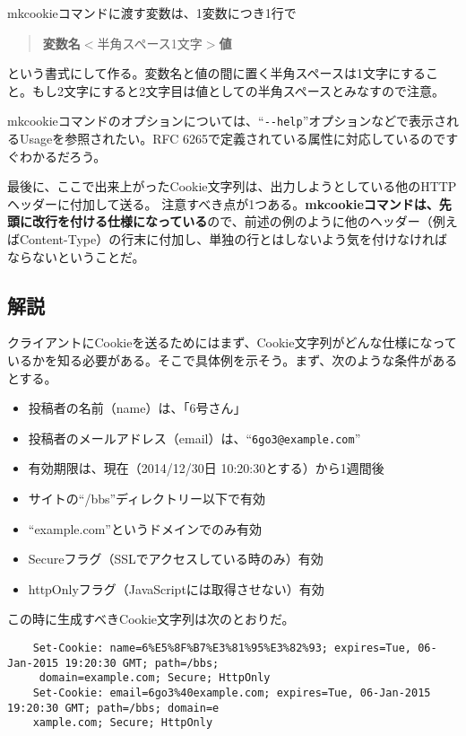 mkcookieコマンドに渡す変数は、1変数につき1行で
\begin{quote}
	\textbf{変数名}$<$半角スペース1文字$>$\textbf{値}
\end{quote}
という書式にして作る。変数名と値の間に置く半角スペースは1文字にすること。もし2文字にすると2文字目は値としての半角スペースとみなすので注意。

mkcookieコマンドのオプションについては、``\verb|--help|''オプションなどで表示されるUsageを参照されたい。RFC 6265で定義されている属性に対応しているのですぐわかるだろう。

最後に、ここで出来上がったCookie文字列は、出力しようとしている他のHTTPヘッダーに付加して送る。
注意すべき点が1つある。\textbf{mkcookieコマンドは、先頭に改行を付ける仕様になっている}ので、前述の例のように他のヘッダー（例えばContent-Type）の行末に付加し、単独の行とはしないよう気を付けなければならないということだ。

\subsection*{解説}

クライアントにCookieを送るためにはまず、Cookie文字列がどんな仕様になっているかを知る必要がある。そこで具体例を示そう。まず、次のような条件があるとする。
\begin{itemize}
  \item 投稿者の名前（name）は、「6号さん」
  \item 投稿者のメールアドレス（email）は、``\verb|6go3@example.com|''
  \item 有効期限は、現在（2014/12/30日 10:20:30とする）から1週間後
  \item サイトの``/bbs''ディレクトリー以下で有効
  \item ``example.com''というドメインでのみ有効
  \item Secureフラグ（SSLでアクセスしている時のみ）有効
  \item httpOnlyフラグ（JavaScriptには取得させない）有効
\end{itemize}

この時に生成すべきCookie文字列は次のとおりだ。\\
\begin{frameboxit}{160.0mm}
\begin{verbatim}
	Set-Cookie: name=6%E5%8F%B7%E3%81%95%E3%82%93; expires=Tue, 06-Jan-2015 19:20:30 GMT; path=/bbs;
	 domain=example.com; Secure; HttpOnly
	Set-Cookie: email=6go3%40example.com; expires=Tue, 06-Jan-2015 19:20:30 GMT; path=/bbs; domain=e
	xample.com; Secure; HttpOnly
\end{verbatim}
\end{frameboxit}

